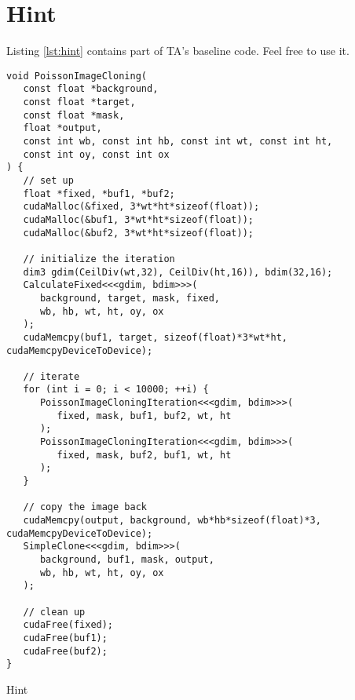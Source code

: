 \documentclass[12pt,a4paper]{article}
\newcommand{\lstref}[1]{Listing \ref{lst:#1}}
\begin{document}
\section{Hint}
\lstref{hint} contains part of TA's baseline code. Feel free to use it.

\pagebreak

\begin{listing}
\begin{verbatim}
void PoissonImageCloning(
   const float *background,
   const float *target,
   const float *mask,
   float *output,
   const int wb, const int hb, const int wt, const int ht,
   const int oy, const int ox
) {
   // set up
   float *fixed, *buf1, *buf2;
   cudaMalloc(&fixed, 3*wt*ht*sizeof(float));
   cudaMalloc(&buf1, 3*wt*ht*sizeof(float));
   cudaMalloc(&buf2, 3*wt*ht*sizeof(float));

   // initialize the iteration
   dim3 gdim(CeilDiv(wt,32), CeilDiv(ht,16)), bdim(32,16);
   CalculateFixed<<<gdim, bdim>>>(
      background, target, mask, fixed,
      wb, hb, wt, ht, oy, ox
   );
   cudaMemcpy(buf1, target, sizeof(float)*3*wt*ht, cudaMemcpyDeviceToDevice);

   // iterate
   for (int i = 0; i < 10000; ++i) {
      PoissonImageCloningIteration<<<gdim, bdim>>>(
         fixed, mask, buf1, buf2, wt, ht
      );
      PoissonImageCloningIteration<<<gdim, bdim>>>(
         fixed, mask, buf2, buf1, wt, ht
      );
   }

   // copy the image back
   cudaMemcpy(output, background, wb*hb*sizeof(float)*3, cudaMemcpyDeviceToDevice);
   SimpleClone<<<gdim, bdim>>>(
      background, buf1, mask, output,
      wb, hb, wt, ht, oy, ox
   );

   // clean up
   cudaFree(fixed);
   cudaFree(buf1);
   cudaFree(buf2);
}
\end{verbatim}
\caption{Hint}\label{lst:hint}
\end{listing}
\end{document}

